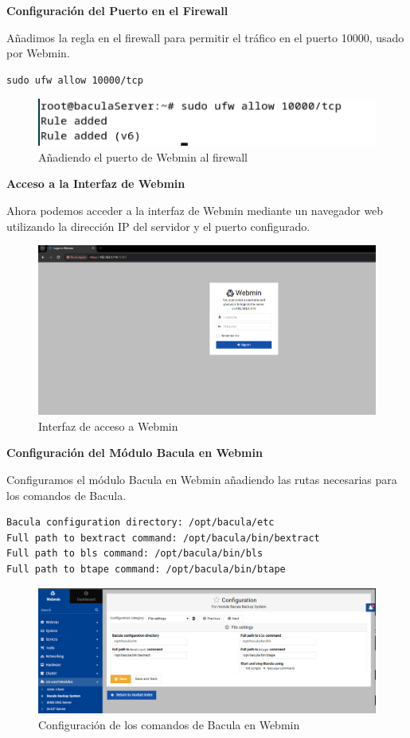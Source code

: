 \textbf{Configuración del Puerto en el Firewall}
\medskip

Añadimos la regla en el firewall para permitir el tráfico en el puerto 10000, usado por Webmin.
\begin{verbatim}
sudo ufw allow 10000/tcp
\end{verbatim}

\begin{figure}[H]
    \centering
    \includegraphics[width=0.5\linewidth]{instalacionBacula/puerto10000.png}
    \caption{Añadiendo el puerto de Webmin al firewall}
\end{figure}

\textbf{Acceso a la Interfaz de Webmin}
\medskip

Ahora podemos acceder a la interfaz de Webmin mediante un navegador web utilizando la dirección IP del servidor y el puerto configurado.

\begin{figure}[H]
    \centering
    \includegraphics[width=0.5\linewidth]{instalacionBacula/webmin.png}
    \caption{Interfaz de acceso a Webmin}
\end{figure}

\textbf{Configuración del Módulo Bacula en Webmin}
\medskip

Configuramos el módulo Bacula en Webmin añadiendo las rutas necesarias para los comandos de Bacula.
\begin{verbatim}
Bacula configuration directory: /opt/bacula/etc
Full path to bextract command: /opt/bacula/bin/bextract
Full path to bls command: /opt/bacula/bin/bls
Full path to btape command: /opt/bacula/bin/btape
\end{verbatim}

\begin{figure}[H]
    \centering
    \includegraphics[width=0.5\linewidth]{instalacionBacula/pathwebmin.png}
    \caption{Configuración de los comandos de Bacula en Webmin}
\end{figure}

